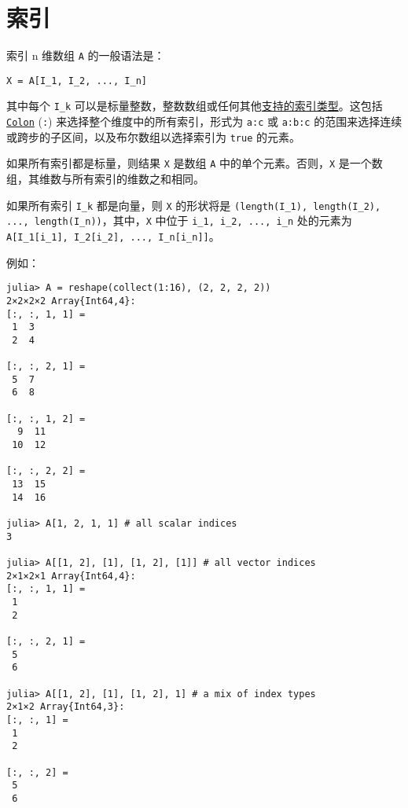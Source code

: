 \hypertarget{14469287548874312017}{}


\section{索引}



索引 n 维数组 \texttt{A} 的一般语法是：




\begin{lstlisting}
X = A[I_1, I_2, ..., I_n]
\end{lstlisting}



其中每个 \texttt{I\_k} 可以是标量整数，整数数组或任何其他\hyperlink{3335763678693018755}{支持的索引类型}。这包括 \hyperlink{13649361117037263099}{\texttt{Colon}} (\texttt{:}) 来选择整个维度中的所有索引，形式为 \texttt{a:c} 或 \texttt{a:b:c} 的范围来选择连续或跨步的子区间，以及布尔数组以选择索引为 \texttt{true} 的元素。



如果所有索引都是标量，则结果 \texttt{X} 是数组 \texttt{A} 中的单个元素。否则，\texttt{X} 是一个数组，其维数与所有索引的维数之和相同。



如果所有索引 \texttt{I\_k} 都是向量，则 \texttt{X} 的形状将是 \texttt{(length(I\_1), length(I\_2), ..., length(I\_n))}，其中，\texttt{X} 中位于 \texttt{i\_1, i\_2, ..., i\_n} 处的元素为 \texttt{A[I\_1[i\_1], I\_2[i\_2], ..., I\_n[i\_n]]}。



例如：




\begin{verbatim}
julia> A = reshape(collect(1:16), (2, 2, 2, 2))
2×2×2×2 Array{Int64,4}:
[:, :, 1, 1] =
 1  3
 2  4

[:, :, 2, 1] =
 5  7
 6  8

[:, :, 1, 2] =
  9  11
 10  12

[:, :, 2, 2] =
 13  15
 14  16

julia> A[1, 2, 1, 1] # all scalar indices
3

julia> A[[1, 2], [1], [1, 2], [1]] # all vector indices
2×1×2×1 Array{Int64,4}:
[:, :, 1, 1] =
 1
 2

[:, :, 2, 1] =
 5
 6

julia> A[[1, 2], [1], [1, 2], 1] # a mix of index types
2×1×2 Array{Int64,3}:
[:, :, 1] =
 1
 2

[:, :, 2] =
 5
 6
\end{verbatim}



